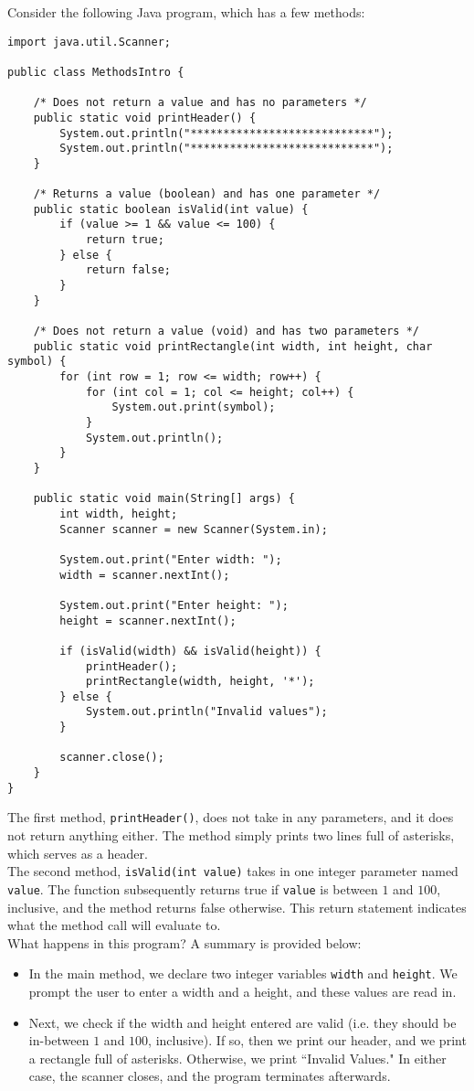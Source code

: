 Consider the following Java program, which has a few methods:
\begin{lstlisting}
import java.util.Scanner;

public class MethodsIntro {

	/* Does not return a value and has no parameters */
	public static void printHeader() {
		System.out.println("****************************");
		System.out.println("****************************");
	}

	/* Returns a value (boolean) and has one parameter */
	public static boolean isValid(int value) {
		if (value >= 1 && value <= 100) {
			return true;
		} else {
			return false;
		}
	}

	/* Does not return a value (void) and has two parameters */
	public static void printRectangle(int width, int height, char symbol) {
		for (int row = 1; row <= width; row++) {
			for (int col = 1; col <= height; col++) {
				System.out.print(symbol);
			}
			System.out.println();
		}
	}

	public static void main(String[] args) {
		int width, height;
		Scanner scanner = new Scanner(System.in);

		System.out.print("Enter width: ");
		width = scanner.nextInt();

		System.out.print("Enter height: ");
		height = scanner.nextInt();

		if (isValid(width) && isValid(height)) {
			printHeader();
			printRectangle(width, height, '*');
		} else {
			System.out.println("Invalid values");
		}

		scanner.close();
	}
}
\end{lstlisting}

The first method, \verb!printHeader()!, does not take in any parameters, and it does not return anything either. The method simply prints two lines full of asterisks, which serves as a header. \\


The second method, \verb!isValid(int value)! takes in one integer parameter named \verb!value!. The function subsequently returns true if \verb!value! is between $1$ and $100$, inclusive, and the method returns false otherwise. This return statement indicates what the method call will evaluate to. \\


What happens in this program? A summary is provided below:
\begin{itemize}
    \item In the main method, we declare two integer variables \verb!width! and \verb!height!. We prompt the user to enter a width and a height, and these values are read in.
    \item Next, we check if the width and height entered are valid (i.e. they should be in-between $1$ and $100$, inclusive). If so, then we print our header, and we print a rectangle full of asterisks. Otherwise, we print ``Invalid Values." In either case, the scanner closes, and the program terminates afterwards.
\end{itemize}



